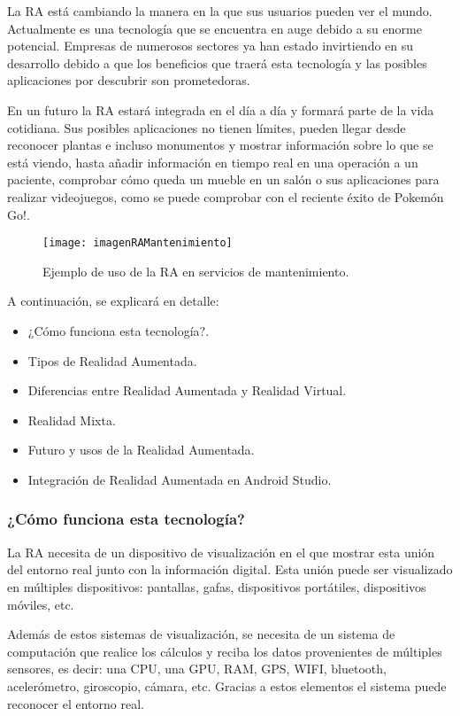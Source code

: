 La RA está cambiando la manera en la que sus usuarios pueden ver el mundo. Actualmente es una tecnología que se encuentra en auge debido a su enorme potencial. Empresas de numerosos sectores ya han estado invirtiendo en su desarrollo debido a que los beneficios que traerá esta tecnología y las posibles aplicaciones por descubrir son prometedoras.


En un futuro la RA estará integrada en el día a día y formará parte de la vida cotidiana. Sus posibles aplicaciones no tienen límites, pueden llegar desde reconocer plantas e incluso monumentos y mostrar información sobre lo que se está viendo, hasta añadir información en tiempo real en una operación a un paciente, comprobar cómo queda un mueble en un salón o sus aplicaciones para realizar videojuegos, como se puede comprobar con el reciente éxito de Pokemón Go!. 

\begin{figure}[h]
    \centering
    \texttt{[image: imagenRAMantenimiento]}
    \caption{Ejemplo de uso de la RA en servicios de mantenimiento.}
    \label{fig:googleglass}
\end{figure}

A continuación, se explicará en detalle:
\begin{itemize}
\item ¿Cómo funciona esta tecnología?.
\item Tipos de Realidad Aumentada.
\item Diferencias entre Realidad Aumentada y Realidad Virtual.
\item Realidad Mixta.
\item Futuro y usos de la Realidad Aumentada.
\item Integración de Realidad Aumentada en Android Studio.
\end{itemize}  

\subsubsection{¿Cómo funciona esta tecnología?}
La RA necesita de un dispositivo de visualización en el que mostrar esta unión del entorno real junto con la información digital. Esta unión puede ser visualizado en múltiples dispositivos: pantallas, gafas, dispositivos portátiles, dispositivos móviles, etc.
 
Además de estos sistemas de visualización, se necesita de un sistema de computación que realice los cálculos y reciba los datos provenientes de múltiples sensores, es decir: una CPU, una GPU, RAM, GPS, WIFI, bluetooth, acelerómetro, giroscopio, cámara, etc. Gracias a estos elementos el sistema puede reconocer el entorno real.

